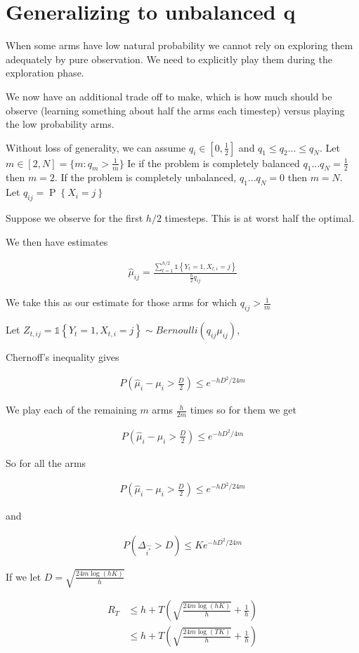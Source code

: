 \documentclass{article}
\newcommand{\set}[1]{\left\{#1\right\}}
\newcommand{\ind}[1]{\mathds{1}\!\!\set{#1}}
\newcommand{\eqn}[1]{\begin{align}#1\end{align}}
\renewcommand{\P}[1]{\operatorname{P}\left\{#1\right\}}
\theoremstyle{plain}
\theoremstyle{definition}
\begin{document}
\section{Generalizing to unbalanced $\boldsymbol{q}$}

When some arms have low natural probability we cannot rely on exploring them adequately by pure observation. We need to explicitly play them during the exploration phase. 

We now have an additional trade off to make, which is how much should be observe (learning something about half the arms each timestep) versus playing the low probability arms. 

Without loss of generality, we can assume $q_i \in [0,\frac{1}{2}]$ and $q_1 \leq q_2 ... \leq q_N$. Let $m \in [2,N] = \{m:q_m > \frac{1}{m}\}$ Ie if the problem is completely balanced $q_1...q_N = \frac{1}{2}$ then $m = 2$. If the problem is completely unbalanced, $q_1...q_N = 0$ then $m=N$. Let $q_{ij} = \P{X_i = j}$



Suppose we observe for the first $h/2$ timesteps. This is at worst half the optimal. 

We then have estimates 

\eqn {
\hat{\mu}_{ij} = \frac{\sum_{t=1}^{h/2}\ind{Y_t=1,X_{t,i}=j}}{\frac{h}{2}q_{ij}}
}

We take this as our estimate for those arms for which $q_{ij} > \frac{1}{m}$

Let $Z_{t,ij} = \ind{Y_t=1,X_{t,i}=j} \sim Bernoulli(q_{ij}\mu_{ij})$, 

Chernoff's inequality gives

\eqn{
P(\hat{\mu}_i - \mu_{i} > \frac{D}{2}) \leq e^{-hD^2/24m}
}

We play each of the remaining $m$ arms $\frac{h}{2m}$ times so for them we get

\eqn{
P(\hat{\mu}_i - \mu_{i} > \frac{D}{2}) \leq e^{-hD^2/4m}
}

So for all the arms 

\eqn{
P(\hat{\mu}_i - \mu_{i} > \frac{D}{2}) \leq e^{-hD^2/24m}
}

and 



\eqn{
\label{eqn:unbalancedHoeffdings}
P(\Delta_{\hat{i^*}} > D) \leq Ke^{-hD^2/24m}
}

If we let $D = \sqrt{\frac{24m\log(hK)}{h}}$

\eqn{
R_T &  \leq h + T\left(\sqrt{\frac{24m\log(hK)}{h}} + \frac{1}{h}\right) \\
& \leq h + T\left(\sqrt{\frac{24m\log(TK)}{h}} + \frac{1}{h}\right) 
}
\end{document}
